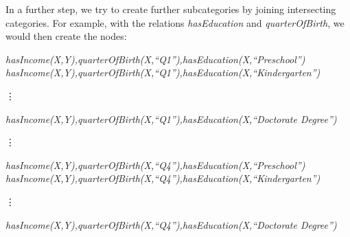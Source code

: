 In a further step, we try to create further subcategories by joining intersecting categories. For example, with the
relations \emph{hasEducation} and \emph{quarterOfBirth}, we would then create the nodes:

  \emph{hasIncome(X,Y),quarterOfBirth(X,``Q1''),hasEducation(X,``Preschool'')} \newline
  \emph{hasIncome(X,Y),quarterOfBirth(X,``Q1''),hasEducation(X,``Kindergarten'')} \newline
  \centerline{\vdots} 
  \emph{hasIncome(X,Y),quarterOfBirth(X,``Q1''),hasEducation(X,``Doctorate Degree'')} \newline

  \centerline{\vdots} 

  \emph{hasIncome(X,Y),quarterOfBirth(X,``Q4''),hasEducation(X,``Preschool'')} \newline
  \emph{hasIncome(X,Y),quarterOfBirth(X,``Q4''),hasEducation(X,``Kindergarten'')} \newline
  \centerline{\vdots} 
  \emph{hasIncome(X,Y),quarterOfBirth(X,``Q4''),hasEducation(X,``Doctorate Degree'')} \newline


